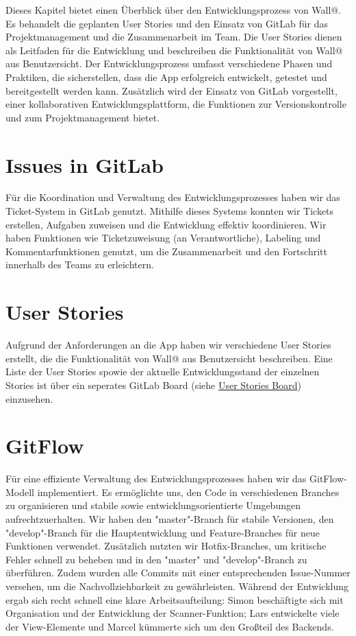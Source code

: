 
Dieses Kapitel bietet einen Überblick über den Entwicklungsprozess von Wall@. 
Es behandelt die geplanten User Stories und den Einsatz von GitLab für das Projektmanagement und die Zusammenarbeit im Team.
Die User Stories dienen als Leitfaden für die Entwicklung und beschreiben die Funktionalität von Wall@ aus Benutzersicht. 
Der Entwicklungsprozess umfasst verschiedene Phasen und Praktiken, die sicherstellen, dass die App erfolgreich entwickelt, getestet und bereitgestellt werden kann.
Zusätzlich wird der Einsatz von GitLab vorgestellt, einer kollaborativen Entwicklungsplattform, die Funktionen zur Versionskontrolle und zum Projektmanagement bietet.

\section{Issues in GitLab}
Für die Koordination und Verwaltung des Entwicklungsprozesses haben wir das Ticket-System in GitLab genutzt. 
Mithilfe dieses Systems konnten wir Tickets erstellen, Aufgaben zuweisen und die Entwicklung effektiv koordinieren. 
Wir haben Funktionen wie Ticketzuweisung (an Verantwortliche), Labeling und Kommentarfunktionen genutzt, 
um die Zusammenarbeit und den Fortschritt innerhalb des Teams zu erleichtern.

\section{User Stories}
Aufgrund der Anforderungen an die App haben wir verschiedene User Stories erstellt, 
die die Funktionalität von Wall@ aus Benutzersicht beschreiben.
Eine Liste der User Stories spowie der aktuelle Entwicklungsstand der einzelnen Stories ist über ein 
seperates GitLab Board (siehe \href{https://gitlab.in.htwg-konstanz.de/mobile-anwendungen-ss23/gruppen/gruppe-4/-/boards/272}{User Stories Board}) einzusehen.

\section{GitFlow}
Für eine effiziente Verwaltung des Entwicklungsprozesses haben wir das GitFlow-Modell implementiert. 
Es ermöglichte uns, den Code in verschiedenen Branches zu organisieren und stabile sowie entwicklungsorientierte Umgebungen aufrechtzuerhalten. 
Wir haben den "master"-Branch für stabile Versionen, den "develop"-Branch für die Hauptentwicklung und Feature-Branches für neue 
Funktionen verwendet. Zusätzlich nutzten wir Hotfix-Branches, um kritische Fehler schnell zu beheben und in den "master" und 
"develop"-Branch zu überführen. Zudem wurden alle Commits mit einer entsprechenden Issue-Nummer versehen, 
um die Nachvollziehbarkeit zu gewährleisten.
\newline
\newline
Während der Entwicklung ergab sich recht schnell eine klare Arbeitsaufteilung: Simon beschäftigte sich mit Organisation und der Entwicklung der Scanner-Funktion; Lars entwickelte viele der View-Elemente und Marcel kümmerte sich um den Großteil des Backends.
